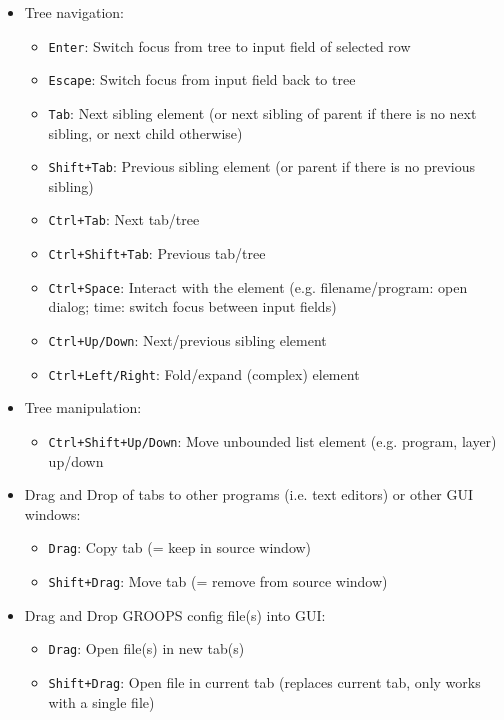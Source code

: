 \begin{itemize}
	\item Tree navigation:
	\begin{itemize}
		\item \verb|Enter|: Switch focus from tree to input field of selected row
		\item \verb|Escape|: Switch focus from input field back to tree
		\item \verb|Tab|: Next sibling element (or next sibling of parent if there is no next sibling, or next child otherwise)
		\item \verb|Shift+Tab|: Previous sibling element (or parent if there is no previous sibling)
		\item \verb|Ctrl+Tab|: Next tab/tree
		\item \verb|Ctrl+Shift+Tab|: Previous tab/tree
		\item \verb|Ctrl+Space|: Interact with the element (e.g. filename/program: open dialog; time: switch focus between input fields)
		\item \verb|Ctrl+Up/Down|: Next/previous sibling element
		\item \verb|Ctrl+Left/Right|: Fold/expand (complex) element
	\end{itemize}
	\item Tree manipulation:
	\begin{itemize}
		\item \verb|Ctrl+Shift+Up/Down|: Move unbounded list element (e.g. program, layer) up/down
	\end{itemize}
	\item Drag and Drop of tabs to other programs (i.e. text editors) or other GUI windows:
	\begin{itemize}
		\item \verb|Drag|: Copy tab (= keep in source window)
		\item \verb|Shift+Drag|: Move tab (= remove from source window)
	\end{itemize}
	\item Drag and Drop GROOPS config file(s) into GUI:
	\begin{itemize}
		\item \verb|Drag|: Open file(s) in new tab(s)
		\item \verb|Shift+Drag|: Open file in current tab (replaces current tab, only works with a single file)
	\end{itemize}
\end{itemize}
